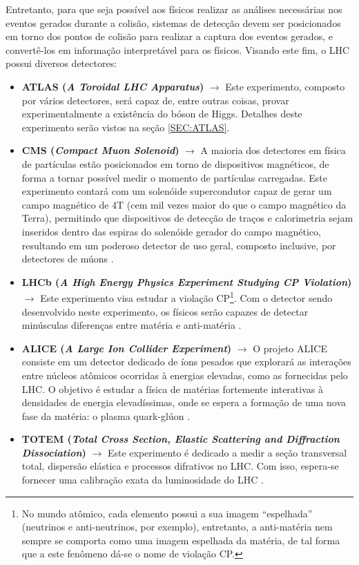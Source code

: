 Entretanto, para que seja possível aos físicos realizar as análises necessárias nos eventos gerados durante a colisão, sistemas de detecção devem ser posicionados em torno dos pontos de colisão para realizar a captura dos eventos gerados, e convertê-los em informação interpretável para os físicos. Visando este fim, o LHC possui diversos detectores:

\begin{itemize}

\item \textbf{ATLAS (\emph{A Toroidal LHC Apparatus})} $\rightarrow$ Este experimento, composto por vários detectores, será capaz de, entre outras coisas, provar experimentalmente a existência do bóson de Higgs. Detalhes deste experimento serão vistos na seção \ref{SEC:ATLAS}.

\item \textbf{CMS (\emph{Compact Muon Solenoid})} $\rightarrow$ A maioria dos detectores em física de partículas estão posicionados em torno de dispositivos magnéticos, de forma a tornar possível medir o momento de partículas carregadas. Este experimento contará com um solenóide supercondutor capaz de gerar um campo magnético de 4T (cem mil vezes maior do que o campo magnético da Terra), permitindo que dispositivos de detecção de traços e calorimetria sejam inseridos dentro das espiras do solenóide gerador do campo magnético, resultando em um poderoso detector de uso geral, composto inclusive, por detectores de múons \cite{bib:cms}.

\item \textbf{LHCb (\emph{A High Energy Physics Experiment Studying CP Violation})} $\rightarrow$ Este experimento visa estudar a violação CP\footnote{No mundo atômico, cada elemento possui a sua imagem ``espelhada'' (neutrinos e anti-neutrinos, por exemplo), entretanto, a anti-matéria nem sempre se comporta como uma imagem espelhada da matéria, de tal forma que a este fenômeno dá-se o nome de violação CP.}. Com o detector sendo desenvolvido neste experimento, os físicos serão capazes de detectar minúsculas diferenças entre matéria e anti-matéria \cite{bib:lhcb}.

\item \textbf{ALICE (\emph{A Large Ion Collider Experiment})} $\rightarrow$ O projeto ALICE consiste em um detector dedicado de íons pesados que explorará as interações entre núcleos atômicos ocorridas à energias elevadas, como as fornecidas pelo LHC. O objetivo é estudar a física de matérias fortemente interativas à densidades de energia elevadíssimas, onde se espera a formação de uma nova fase da matéria: o plasma quark-glúon \cite{bib:alice}.

\item \textbf{TOTEM (\emph{Total Cross Section, Elastic Scattering
and Diffraction Dissociation})} $\rightarrow$ Este experimento é dedicado a medir a seção transversal total, dispersão elástica e processos difrativos no LHC. Com isso, espera-se fornecer uma calibração exata da luminosidade do LHC \cite{bib:totem}.

\end{itemize}



